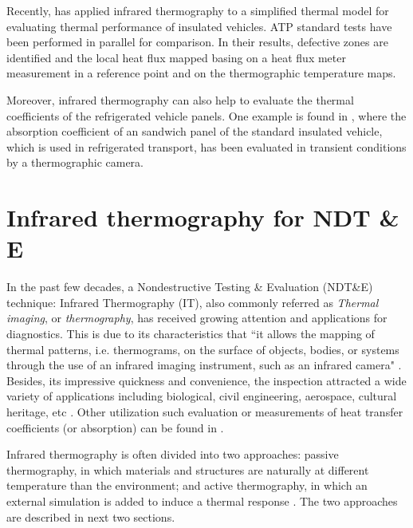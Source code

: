 Recently, \citep{rossi2009k} has applied infrared thermography to a simplified thermal model for evaluating thermal performance of insulated vehicles. ATP standard tests have been performed in parallel for comparison. In their results, defective zones are identified and the local heat flux mapped basing on a heat flux meter measurement in a reference point and on the thermographic temperature maps.

Moreover, infrared thermography can also help to evaluate the thermal coefficients of the refrigerated vehicle panels. One example is found in \citep{dragano2009experimental}, where the absorption coefficient of an sandwich panel of the standard insulated vehicle, which is used in refrigerated transport, has been evaluated in transient conditions by a thermographic camera.



\newpage
\section*{Infrared thermography for NDT \& E}

In the past few decades, a Nondestructive Testing \& Evaluation (NDT\&E) technique: Infrared Thermography (IT), also commonly referred as \textit{Thermal imaging}, or \textit{thermography}, has received growing attention and applications for diagnostics. This is due to its characteristics that ``it allows the mapping of thermal patterns, i.e. thermograms, on the surface of objects, bodies, or systems through the use of an infrared imaging instrument, such as an infrared camera" \citep{maldague3introduction}. Besides, its impressive quickness and convenience, the inspection attracted a wide variety of applications including biological, civil engineering, aerospace, cultural heritage, etc \citep{2007-Ibarra-Castanedo,2000-Li,cielo1987thermographie,shoja2011inspection,pradere2009microscale,avdelidis2004applications,maierhofer2005quantitative}. Other utilization such evaluation or measurements of heat transfer coefficients (or absorption) can be found in \citep{dragano2009experimental,grinzato2010r,grinzatoquality,grinzato1comparison,rossi2009k}.

Infrared thermography is often divided into two approaches: passive thermography, in which materials and structures are naturally at different temperature than the environment; and active thermography, in which an external simulation is added to induce a thermal response \citep{Maldague2001theory}. The two approaches are described in next two sections.
